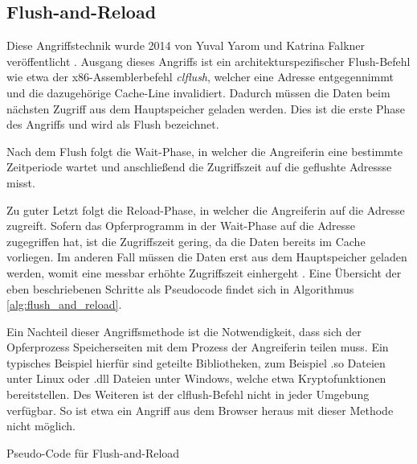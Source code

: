 
\subsection{Flush-and-Reload}

Diese Angriffstechnik wurde 2014 von Yuval Yarom
und Katrina Falkner veröffentlicht \cite{FlushReload}.
Ausgang dieses Angriffs ist ein architekturspezifischer Flush-Befehl wie etwa der x86-Assemblerbefehl \textit{clflush}, welcher eine Adresse entgegennimmt und die dazugehörige Cache-Line invalidiert. 
Dadurch müssen die Daten beim nächsten Zugriff aus dem Hauptspeicher geladen werden. Dies ist die erste Phase des Angriffs und wird als Flush bezeichnet. 

Nach dem Flush folgt die Wait-Phase, in welcher die Angreiferin eine bestimmte Zeitperiode wartet und anschließend die Zugriffszeit auf die geflushte Adressse misst. 

Zu guter Letzt folgt die Reload-Phase, in welcher die Angreiferin auf die Adresse zugreift. Sofern das Opferprogramm in der Wait-Phase auf die Adresse zugegriffen hat, ist die Zugriffszeit gering, da die Daten bereits im Cache vorliegen.
Im anderen Fall müssen die Daten erst aus dem Hauptspeicher geladen werden, womit eine messbar erhöhte Zugriffszeit einhergeht \cite{FlushReload}. Eine Übersicht der eben beschriebenen Schritte als Pseudocode findet sich in Algorithmus \ref{alg:flush_and_reload}.

Ein Nachteil dieser Angriffsmethode ist die Notwendigkeit, dass sich der Opferprozess Speicherseiten mit dem Prozess der Angreiferin teilen muss. 
Ein typisches Beispiel hierfür sind geteilte Bibliotheken, zum Beispiel .so Dateien unter Linux oder .dll Dateien unter Windows, welche etwa Kryptofunktionen bereitstellen. Des Weiteren ist der clflush-Befehl nicht in jeder Umgebung verfügbar. So ist etwa ein Angriff aus dem Browser heraus mit dieser Methode nicht möglich. 



\begin{algorithm}[h]
\DontPrintSemicolon
\caption{Pseudo-Code für Flush-and-Reload}
\label{alg:flush_and_reload}



\end{algorithm}


